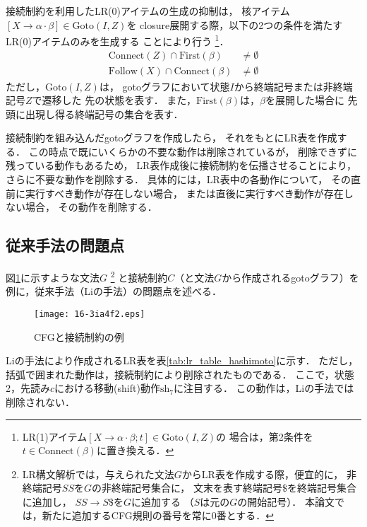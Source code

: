 \documentclass[japanese]{jnlp_1.4}
\begin{document}
接続制約を利用したLR(0)アイテムの生成の抑制は，
核アイテム$[X\to\alpha\cdot\beta]\in\mathrm{Goto}(I,Z)$を
closure展開する際，以下の2つの条件を満たすLR(0)アイテムのみを生成する
ことにより行う
\footnote{LR(1)アイテム$[X\to\alpha\cdot\beta;t]\in\mathrm{Goto}(I,Z)$の
  場合は，第2条件を$t\in\mathrm{Connect}(\beta)$に置き換える．}．
\begin{align*}
  \mathrm{Connect}(Z)\cap\mathrm{First}(\beta)&\neq\emptyset\\
  \mathrm{Follow}(X)\cap\mathrm{Connect}(\beta)&\neq\emptyset
\end{align*}
ただし，$\mathrm{Goto}(I,Z)$は，
gotoグラフにおいて状態$I$から終端記号または非終端記号$Z$で遷移した
先の状態を表す．
また，$\mathrm{First}(\beta)$は，$\beta$を展開した場合に
先頭に出現し得る終端記号の集合を表す．

接続制約を組み込んだgotoグラフを作成したら，
それをもとにLR表を作成する．
この時点で既にいくらかの不要な動作は削除されているが，
削除できずに残っている動作もあるため，
LR表作成後に接続制約を伝播させることにより，
さらに不要な動作を削除する．
具体的には，LR表中の各動作について，
その直前に実行すべき動作が存在しない場合，
または直後に実行すべき動作が存在しない場合，
その動作を削除する．


\subsection{従来手法の問題点}
\label{sec:problem}

図\ref{fig:ex_cfg3}に示すような文法$G$
\footnote{LR構文解析では，与えられた文法$G$からLR表を作成する際，便宜的に，
  非終端記号$\mathit{SS}$を$G$の非終端記号集合に，
  文末を表す終端記号$\$$を終端記号集合に追加し，
  $\mathit{SS}\to S\$$を$G$に追加する
 （$S$は元の$G$の開始記号）．
  本論文では，新たに追加するCFG規則の番号を常に0番とする．}
と接続制約$C$（と文法$G$から作成されるgotoグラフ）を
例に，従来手法（Liの手法）の問題点を述べる．

\begin{figure}[b]
\begin{center}
\texttt{[image: 16-3ia4f2.eps]}
\end{center}
  \caption{CFGと接続制約の例}
  \label{fig:ex_cfg3}
\end{figure}

Liの手法により作成されるLR表を表\ref{tab:lr_table_hashimoto}に示す．
ただし，括弧で囲まれた動作は，接続制約により削除されたものである．
ここで，状態2，先読み$c$における移動(shift)動作$\mathrm{sh}_7$に注目する．
この動作は，Liの手法では削除されない．
\end{document}
